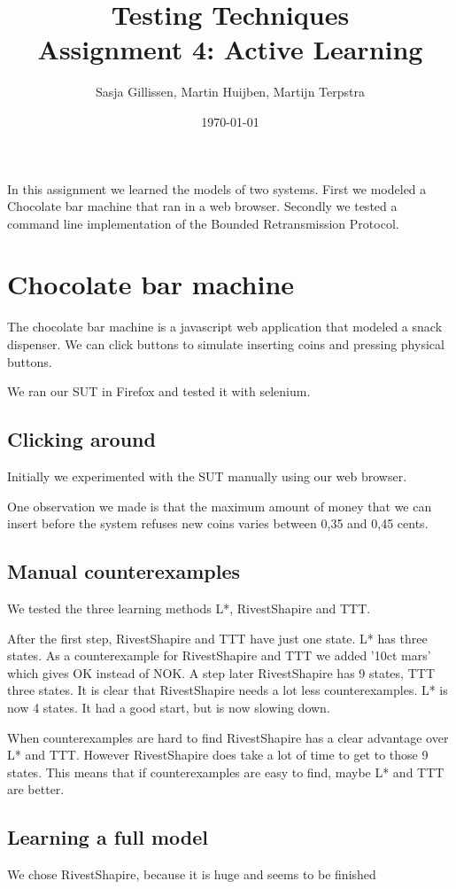 \documentclass[11pt,a4paper]{article}
\author{Sasja Gillissen, Martin Huijben, Martijn Terpstra}
\date{\today}
\title{Testing Techniques\\
  \textbf{Assignment 4: Active Learning}}
\begin{document}
\maketitle

In this assignment we learned the models of two systems. First we
modeled a Chocolate bar machine that ran in a web browser. Secondly we
tested a command line implementation of the Bounded Retransmission Protocol.

\section{Chocolate bar machine}
The chocolate bar machine is a javascript web application that modeled
a snack dispenser. We can click buttons to simulate inserting coins
and pressing physical buttons.

We ran our SUT in Firefox and tested it with selenium.

\subsection{Clicking around}
Initially we experimented with the SUT manually using our web browser.

One observation we made is that the maximum amount of money that we
can insert before the system refuses new coins varies between 0,35 and
0,45 cents.

\subsection{Manual counterexamples}
We tested the three learning methods L*, RivestShapire and TTT.

After the first step, RivestShapire and TTT have just one state. L*
has three states. As a counterexample for RivestShapire and TTT we
added '10ct mars' which gives OK instead of NOK. A step later
RivestShapire has 9 states, TTT three states. It is clear that
RivestShapire needs a lot less counterexamples. L* is now 4 states. It
had a good start, but is now slowing down.

When counterexamples are hard to find RivestShapire has a clear
advantage over L* and TTT. However RivestShapire does take a lot of
time to get to those 9 states. This means that if counterexamples are
easy to find, maybe L* and TTT are better.


\subsection{Learning a full model}
We chose RivestShapire, because it is huge and seems to be finished
\end{document}
